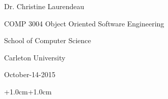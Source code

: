 \documentclass[english]{article}
\begin{document}
\begin{center}
{\large{}Dr. Christine Laurendeau}
\par\end{center}{\large \par}

\begin{center}
{\large{}COMP 3004 Object Oriented Software Engineering}
\par\end{center}{\large \par}

\begin{center}
{\large{}School of Computer Science}
\par\end{center}{\large \par}

\begin{center}
{\large{}Carleton University}
\par\end{center}{\large \par}

\vspace{2cm}


\begin{center}
{\large{}October-14-2015}
\par\end{center}{\large \par}

\newpage{}

\begin{adjustwidth*}{+1.0cm}{+1.0cm}

\tableofcontents{}

\renewcommand{\listfigurename}{Figures}

\listoffigures


\renewcommand{\listtablename}{Tables}

\listoftables


\end{adjustwidth*}

\newpage{}
\end{document}
